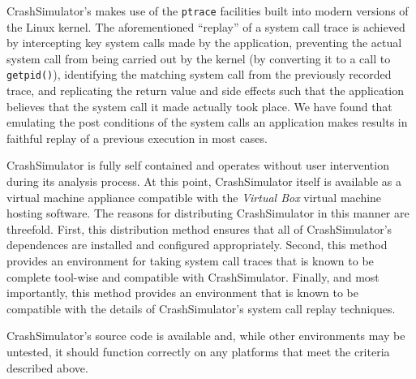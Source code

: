     CrashSimulator's makes use of the {\tt ptrace} facilities built into modern
    versions of the Linux kernel. The aforementioned ``replay'' of a system call
    trace is achieved by intercepting key system calls made by the application,
    preventing the actual system call from being carried out by the kernel (by
    converting it to a call to {\tt getpid()}), identifying the matching system
    call from the previously recorded trace, and replicating the return value
    and side effects such that the application believes that the system call it
    made actually took place. We have found that emulating the post conditions
    of the system calls an application makes results in faithful replay of a
    previous execution in most cases.

    CrashSimulator is fully self contained and operates without user
    intervention during its analysis process. At this point, CrashSimulator
    itself is available as a virtual machine appliance compatible with the
    \emph{Virtual Box} virtual machine hosting software.  The reasons for
    distributing CrashSimulator in this manner are threefold.  First, this
    distribution method ensures that all of CrashSimulator's dependences are
    installed and configured appropriately.  Second, this method provides an
    environment for taking system call traces that is known to be complete
    tool-wise and compatible with CrashSimulator.  Finally, and most importantly,
    this method provides an environment that is known to be compatible with the
    details of CrashSimulator's system call replay techniques.

    CrashSimulator's source code is available and, while other environments may
    be untested, it should function correctly on any platforms that meet the
    criteria described above.
